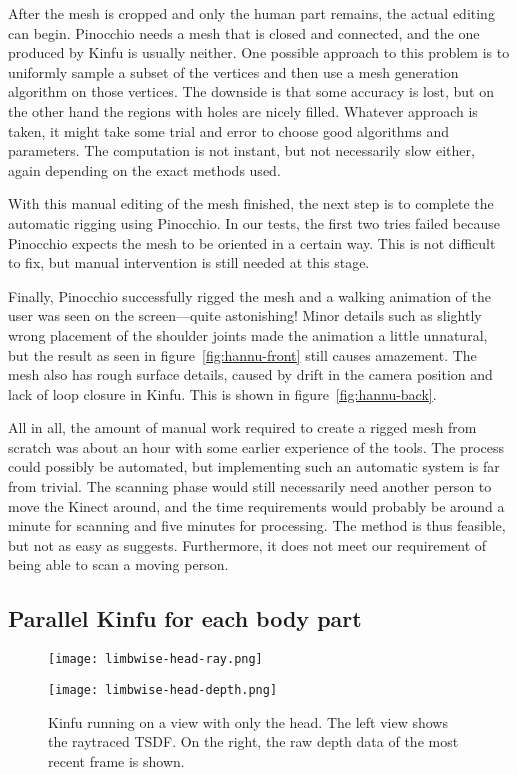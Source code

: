 After the mesh is cropped and only the human part remains, the actual editing can begin. Pinocchio needs a mesh that is closed and connected, and the one produced by Kinfu is usually neither. One possible approach to this problem is to uniformly sample a subset of the vertices and then use a mesh generation algorithm on those vertices. The downside is that some accuracy is lost, but on the other hand the regions with holes are nicely filled. Whatever approach is taken, it might take some trial and error to choose good algorithms and parameters. The computation is not instant, but not necessarily slow either, again depending on the exact methods used.

With this manual editing of the mesh finished, the next step is to complete the automatic rigging using Pinocchio. In our tests, the first two tries failed because Pinocchio expects the mesh to be oriented in a certain way. This is not difficult to fix, but manual intervention is still needed at this stage.

Finally, Pinocchio successfully rigged the mesh and a walking animation of the user was seen on the screen---quite astonishing! Minor details such as slightly wrong placement of the shoulder joints made the animation a little unnatural, but the result as seen in figure~\ref{fig:hannu-front} still causes amazement. The mesh also has rough surface details, caused by drift in the camera position and lack of loop closure in Kinfu. This is shown in figure~\ref{fig:hannu-back}.

All in all, the amount of manual work required to create a rigged mesh from scratch was about an hour with some earlier experience of the tools. The process could possibly be automated, but implementing such an automatic system is far from trivial. The scanning phase would still necessarily need another person to move the Kinect around, and the time requirements would probably be around a minute for scanning and five minutes for processing. The method is thus feasible, but not as easy as \citet{charpentier2011accurate} suggests. Furthermore, it does not meet our requirement of being able to scan a moving person.

\subsection{Parallel Kinfu for each body part} \label{approach.parallel}

\begin{figure}
    \centering
    \begin{minipage}{0.49\textwidth}
        \texttt{[image: limbwise-head-ray.png]}
    \end{minipage}
    \begin{minipage}{0.49\textwidth}
        \texttt{[image: limbwise-head-depth.png]}
    \end{minipage}
    \caption{Kinfu running on a view with only the head. The left view shows the raytraced TSDF. On the right, the raw depth data of the most recent frame is shown.}
    \label{fig:limbwise-head}
\end{figure}

